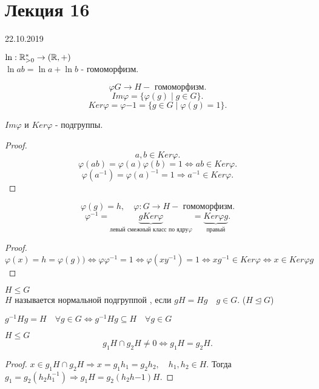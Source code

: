\documentclass[12pt]{report}
\begin{document}
\section{Лекция 16}
22.10.2019
\begin{ex}
    $\ln : \mathbb{R}_{>0}^{*} \to (\mathbb{R}, +)$ \\
    $\ln ab = \ln a + \ln b$ - гомоморфизм.
\end{ex}
\begin{defn}
    \[
    \varphi G \to H - \mbox{ гомоморфизм}
    .\] 
    \[
	Im \varphi = \{\varphi(g) \mid g \in  G\} 
    .\] 
    \[
	Ker \varphi = \varphi{-1} = \{g \in  G \mid \varphi (g) = 1\}
    .\] 
\end{defn}
\begin{lm}
    $Im \varphi$ и $Ker \varphi$ - подгруппы.
\end{lm}
\begin{proof}
    \[
    a, b \in  Ker \varphi
    .\] 
    \[
	\varphi(a b) = \varphi(a) \varphi(b) = 1 \Leftrightarrow ab \in  Ker \varphi
    .\] 
    \[
	\varphi(a^{-1}) = \varphi(a)^{-1} = 1 \Rightarrow a^{-1} \in  Ker \varphi
    .\] 
\end{proof}
\begin{lm}
    \[
	\varphi (g) = h, \quad \varphi : G \to H - \mbox{ гомоморфизм} 
    .\] 
    \[
	\varphi^{-1} = \underbrace{g Ker \varphi}_{\mbox{левый смежный класс по ядру} \varphi} = \underbrace{Ker \varphi g}_{\mbox{правый}}
    .\] 
\end{lm}
\begin{proof}
    $
    \varphi(x) = h = \varphi (g))  \Leftrightarrow \varphi \varphi^{-1} = 1 \Leftrightarrow \varphi(x y^{-1}) = 1\Leftrightarrow xg^{-1} \in  Ker \varphi \Leftrightarrow x \in  Ker \varphi g
	$
\end{proof}
\begin{defn}
    $H \le G$ \\
    $H$ называется нормальной подгруппой , если $gH = Hg \quad g \in  G$. ($H \trianglelefteq G$)
\end{defn}
\begin{note}
    $g^{-1} H g = H \quad \forall g \in  G\Leftrightarrow g^{-1} H g \subseteq H \quad \forall g \in  G$
\end{note}
\begin{lm}
    $H \le G$\\
    \[
    g_1H \cap g_2H \ne 0 \Leftrightarrow g_1H = g_2H
    .\] 
\end{lm}
\begin{proof}
    $x \in  g_1H \cap g_2H \Rightarrow x = g_1h_1 = g_2h_2, \quad h_1, h_2 \in H$. Тогда $g_1 = g_2 (h_2 h_1^{-1}) \Rightarrow g_1H = g_2 (h_2 h{-1}) H$.
\end{proof}
\end{document}
